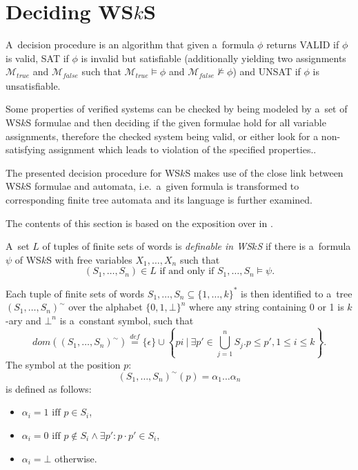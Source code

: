 \section{Deciding WS$k$S}\label{classical}

A~decision procedure is an algorithm that given a~formula $\phi$ returns VALID
if $\phi$ is valid, SAT if $\phi$ is invalid but satisfiable (additionally
yielding two assignments $\mathcal{M}_{true}$ and $\mathcal{M}_{false}$ such
that $\mathcal{M}_{\mathit{true}} \models \phi$ and
$\mathcal{M}_{\mathit{false}} \not\models \phi$) and UNSAT if $\phi$ is unsatisfiable.

Some properties of verified systems can be checked by being modeled by a~set of
WS$k$S formulae and then deciding if the given formulae hold for all variable
assignments, therefore the checked system being valid, or either look for a
non-satisfying assignment which leads to violation of the specified properties..

The presented decision procedure for WS$k$S makes use of the close link between
WS$k$S formulae and automata, i.e.\ a~given formula is transformed to
corresponding finite tree automata and its language is further examined. 

The contents of this section is based on the exposition over in \cite{tata}.

\begin{defz}
 A~set $L$ of tuples of finite sets of words is \emph{definable in WS$k$S} if
 there is a~formula $\psi$ of WS$k$S with free variables $X_1,\ldots,X_n$ such
 that \begin{equation}(S_1,\ldots,S_n) \in L \text{ if and only if }
 S_1,\ldots,S_n \models \psi.\end{equation}
\end{defz} Each tuple of finite sets of words $S_1,\ldots,S_n \subseteq
\{1,\ldots,k\}^*$ is then identified to a~tree $(S_1,\ldots,S_n)^\sim$ over the
alphabet $\{0,1,\bot\}^n$ where any string containing 0 or 1 is $k$-ary and
$\bot^n$ is a~constant symbol, such that
 \begin{equation}
  dom((S_1,\ldots,S_n)^\sim) \overset{\mathit{def}}{=} \{\epsilon\} \cup \left\{
  pi\ \Bigg|\ \exists p' \in \bigcup_{j = 1}^n S_j.p \leq p', 1 \leq i \leq
  k\right\}.
 \end{equation}
The symbol at the position $p$: \begin{equation}(S_1,\ldots,S_n)^\sim(p) =
\alpha_1\ldots\alpha_n\end{equation} is defined as follows:
 \begin{itemize}
  \item $\alpha_i = 1 \text{ iff } p \in S_i$,
  \item $\alpha_i = 0 \text{ iff } p \notin S_i \wedge \exists p': p\cdot p' \in S_i$,
  \item $\alpha_i = \bot$ otherwise.
 \end{itemize}
 
